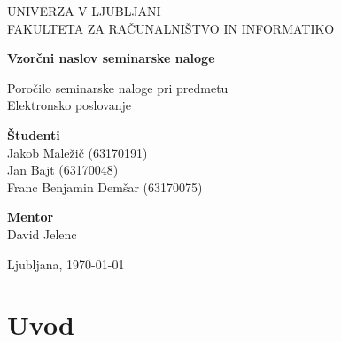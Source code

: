 \documentclass[a4paper,12pt]{report}
\newcommand{\naslov}     {Vzorčni naslov seminarske naloge}
\newcommand{\prviavtor}  {Jakob Maležič}
\newcommand{\prviindeks} {63170191}
\newcommand{\drugiavtor} {Jan Bajt}
\newcommand{\drugiindeks}{63170048}
\newcommand{\tretjiavtor} {Franc Benjamin Demšar}
\newcommand{\tretjiindeks}{63170075}
\newcommand{\kraj}       {Ljubljana}
\begin{document}
\begin{titlepage}
	\begin{center}
	{UNIVERZA V LJUBLJANI\\[10pt] 
	FAKULTETA ZA RAČUNALNIŠTVO IN INFORMATIKO}

	\vspace{65mm}

	{\Large\textbf{\naslov}}

	\vspace{10mm}

	{\large Poročilo seminarske naloge pri predmetu\\[10pt] Elektronsko poslovanje}

	\vfill
	\vspace{60mm}

\hspace{20mm}
\begin{minipage}[t]{70mm}
	{\bf Študenti}\\
	{\prviavtor} ({\prviindeks})\\ 
	{\drugiavtor} ({\drugiindeks})\\
	{\tretjiavtor} ({\tretjiindeks})
\end{minipage}
\begin{minipage}[t]{50mm}
	{\bf Mentor}\\
	David Jelenc
\end{minipage}

	\vspace{35mm}

	{	\kraj, \today}
	\end{center}
\end{titlepage}


\tableofcontents


\chapter{Uvod}
\end{document}
